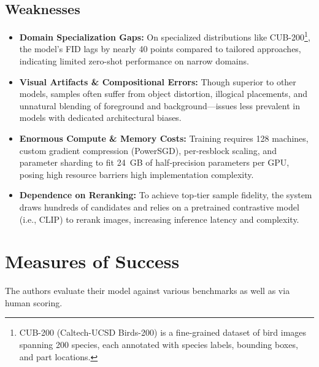 \documentclass[10pt]{article}
\begin{document}
\subsection*{Weaknesses}
\begin{itemize}
    \item \textbf{Domain Specialization Gaps:} On specialized distributions like CUB-200\footnote{CUB-200 (Caltech-UCSD Birds-200) is a fine-grained dataset of bird images spanning 200 species, each annotated with species labels, bounding boxes, and part locations.}, the model’s FID lags by nearly 40 points compared to tailored approaches, indicating limited zero-shot performance on narrow domains.
    \item \textbf{Visual Artifacts \& Compositional Errors:} Though superior to other models, samples often suffer from object distortion, illogical placements, and unnatural blending of foreground and background—issues less prevalent in models with dedicated architectural biases.
    \item \textbf{Enormous Compute \& Memory Costs:} Training requires 128 machines, custom gradient compression (PowerSGD), per-resblock scaling, and parameter sharding to fit 24~GB of half‑precision parameters per GPU, posing high resource barriers high implementation complexity.
    \item \textbf{Dependence on Reranking:} To achieve top‑tier sample fidelity, the system draws hundreds of candidates and relies on a pretrained contrastive model (i.e., CLIP)\cite{DBLP:journals/corr/abs-2103-00020} to rerank images, increasing inference latency and complexity.
\end{itemize}


\section*{Measures of Success}
The authors evaluate their model against various benchmarks as well as via human scoring.
\end{document}
